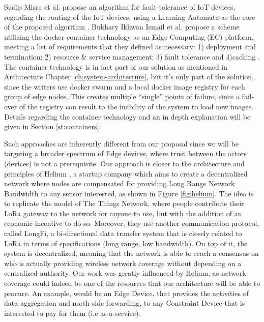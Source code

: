 Sudip Misra et al. propose an algorithm for fault-tolerance of IoT devices, regarding the routing of the IoT devices, using a Learning Automata as the core of the proposed algorithm \cite{misra2012adaptive}. Bukhary Ikhwan Ismail et al. propose a scheme utilizing the docker container technology as an Edge Computing (EC) platform, meeting a list of requirements that they defined as necessary: 1) deployment and termination; 2) resource \& service management; 3) fault tolerance and 4)caching \cite{ismail2015evaluation}.  The container technology  is in fact part of our solution as mentioned in Architecture Chapter \ref{ch:system-architecture}, but it’s only part of the solution, since the writers use docker swarm and a local docker image registry for each group of edge nodes. This creates multiple “single” points of failure, since a fail-over of the registry can result to the inability of the system to load new images. Details regarding the container technology and an in depth explanation will be given in Section \ref{st:containers}.

Such approaches are inherently different from our proposal since we will be targeting a broader spectrum of Edge devices, where trust between the actors (devices) is not a prerequisite. Our approach is closer to the architecture and principles of Helium \cite{helium}, a startup company which aims to create a decentralized network where nodes are compensated for providing Long Range Network Bandwidth to any sensor interested, as shown in Figure \ref{fig:helium}. The idea is to replicate the model of The Things Network\cite{ttn}, where people contribute their LoRa gateway to the network for anyone to use, but with the addition of an economic incentive to do so. Moreover, they use another communication protocol, called LongFi\cite{gemmell-2019}, a bi-directional data transfer system that is closely related to LoRa in terms of specifications (long range, low bandwidth). On top of it, the system is decentralized, meaning that the network is able to reach a consensus on who is actually providing wireless network coverage without depending on a centralized authority. Our work was greatly influenced by Helium, as network coverage could indeed be one of the resources that our architecture will be able to procure. An example, would be an Edge Device, that provides the activities of data aggregation and north-side forwarding, to any Constraint Device that is interested to pay for them (i.e as-a-service).

